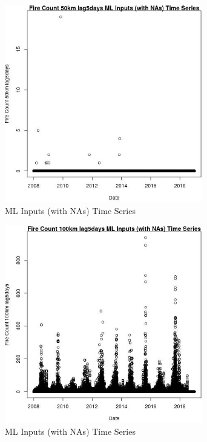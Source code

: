 \begin{figure} 
\centering  
\includegraphics[width=0.77\textwidth]{Code_Outputs/Report_ML_input_PM25_Step4_part_e_de_duplicated_aves_compiled_2019-05-21wNAs_Fire_Count_50km_lag5daysvDate.jpg} 
\caption{\label{fig:Report_ML_input_PM25_Step4_part_e_de_duplicated_aves_compiled_2019-05-21wNAsFire_Count_50km_lag5daysvDate}ML Inputs (with NAs) Time Series} 
\end{figure} 
 

\clearpage 

\begin{figure} 
\centering  
\includegraphics[width=0.77\textwidth]{Code_Outputs/Report_ML_input_PM25_Step4_part_e_de_duplicated_aves_compiled_2019-05-21wNAs_Fire_Count_100km_lag5daysvDate.jpg} 
\caption{\label{fig:Report_ML_input_PM25_Step4_part_e_de_duplicated_aves_compiled_2019-05-21wNAsFire_Count_100km_lag5daysvDate}ML Inputs (with NAs) Time Series} 
\end{figure} 
 

